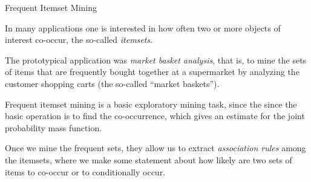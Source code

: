 
\date{Chapter 8: Itemset Mining}

\begin{frame}
\titlepage
\end{frame}

\newcommand{\algbf}{\textsc{BruteForce}\xspace}
\newcommand{\algcomputesupport}{\textsc{ComputeSupport}\xspace}
\newcommand{\algApriori}{\textsc{Apriori}\xspace}
\newcommand{\algextprefix}{\textsc{ExtendPrefixTree}\xspace}
\newcommand{\algeclat}{\textsc{Eclat}\xspace}
\newcommand{\algdeclat}{\textsc{dEclat}\xspace}
\newcommand{\algfpgrowth}{\textsc{FPGrowth}\xspace}
\newcommand{\algrulemining}{\textsc{AssociationRules}\xspace}


\begin{frame}{Frequent Itemset Mining}

In many applications one is interested in how often two or more
objects of interest co-occur, the so-called {\em itemsets}. 

\medskip
The prototypical application was {\it market basket
analysis}, that is, to mine the sets of items that are frequently
bought together at a supermarket by analyzing the customer
shopping carts (the so-called ``market baskets''). 

\medskip
Frequent itemset mining is a basic exploratory mining task, since the
since the basic operation is to find the co-occurrence, which gives an
estimate for the joint probability mass function.

\medskip
Once we mine the frequent sets, they allow us to extract {\em
association rules} among the itemsets, where we make some
statement about how likely are two sets of items to co-occur or
to conditionally occur. 

\end{frame}


